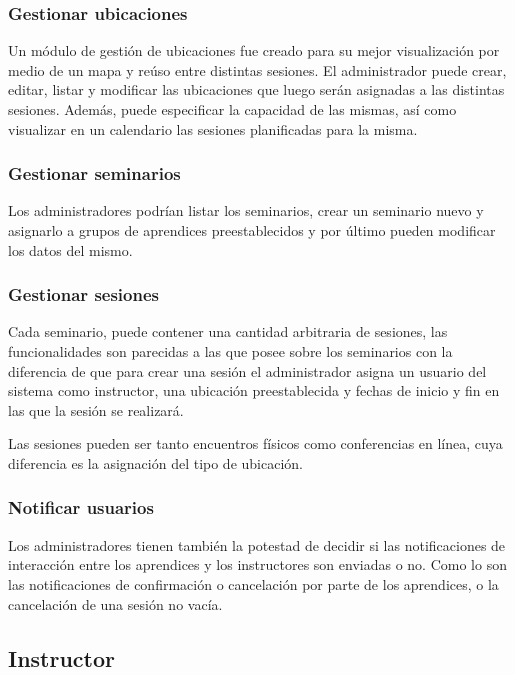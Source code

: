 			\subsubsection{Gestionar ubicaciones}

			Un módulo de gestión de ubicaciones fue creado para su mejor visualización por medio de un mapa y reúso entre distintas sesiones. El administrador puede crear, editar, listar y modificar las ubicaciones que luego serán asignadas a las distintas sesiones. Además, puede especificar la capacidad de las mismas, así como visualizar en un calendario las sesiones planificadas para la misma.

			\subsubsection{Gestionar seminarios}

			Los administradores podrían listar los seminarios, crear un seminario nuevo y asignarlo a grupos de aprendices preestablecidos y por último pueden modificar los datos del mismo.


			\subsubsection{Gestionar sesiones}	
			
			Cada seminario, puede contener una cantidad arbitraria de sesiones, las funcionalidades son parecidas a las que posee sobre los seminarios con la diferencia de que para crear una sesión el administrador asigna un usuario del sistema como instructor, una ubicación preestablecida y fechas de inicio y fin en las que la sesión se realizará.

			Las sesiones pueden ser tanto encuentros físicos como conferencias en línea, cuya diferencia es la asignación del tipo de ubicación.

			\subsubsection{Notificar usuarios}

			Los administradores tienen también la potestad de decidir si las notificaciones de interacción entre los aprendices y los instructores son enviadas o no. Como lo son las notificaciones de confirmación o cancelación por parte de los aprendices, o la cancelación de una sesión no vacía.


		\subsection{Instructor} %
		\label{sub:instructor}
		
